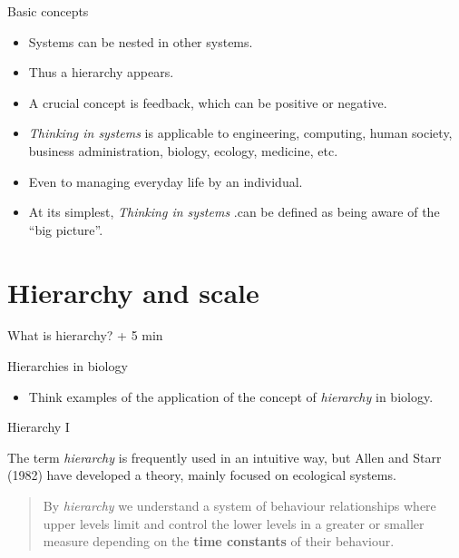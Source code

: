 \documentclass[10pt]{beamer}
\begin{document}
\begin{frame}{Basic concepts}
  \begin{itemize}
    \item Systems can be nested in other systems.
    \item Thus a hierarchy appears.
    \item A crucial concept is feedback, which can be positive or negative.
    \item \emph{Thinking in systems} is applicable to engineering, computing, human society, business administration, biology, ecology, medicine, etc.
    \item Even to managing everyday life by an individual.
    \item At its simplest, \emph{Thinking in systems} .can be defined as being aware of the ``big picture''.
  \end{itemize}
\end{frame}

\section{Hierarchy and scale}
\nocite{Allen1982}
\begin{frame}{What is hierarchy?  + 5 min}
  \begin{alertblock}{Hierarchies in biology \Discussion}
    \begin{itemize}
      \item Think examples of the application of the concept of \emph{hierarchy} in biology.
    \end{itemize}
  \end{alertblock}
\end{frame}

\begin{frame}{Hierarchy I}

The term \textit{hierarchy} is frequently used in an intuitive way,
but Allen and Starr (1982) have developed a theory, mainly focused
on ecological systems.

\begin{quotation}
By \textit{hierarchy} we understand a system of behaviour
relationships where upper levels limit and control the lower levels
in a greater or smaller measure depending on the \textbf{time
constants} of their behaviour.
\end{quotation}

\end{frame}
\end{document}

